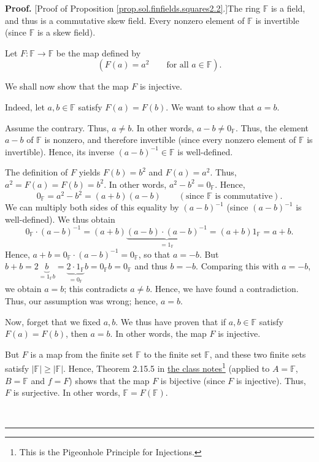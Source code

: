 \documentclass[paper=a4, fontsize=12pt]{scrartcl}%
\theoremstyle{plainsl}
\theoremstyle{definition}
\theoremstyle{remark}
\newenvironment{proof}[1][Proof]{\noindent\textbf{#1.} }{\ \rule{0.5em}{0.5em}}
\begin{document}
\begin{proof}
[Proof of Proposition \ref{prop.sol.finfields.squares2.2}.]The ring
$\mathbb{F}$ is a field, and thus is a commutative skew field. Every nonzero
element of $\mathbb{F}$ is invertible (since $\mathbb{F}$ is a skew field).

Let $F:\mathbb{F}\rightarrow\mathbb{F}$ be the map defined by%
\[
\left(  F\left(  a\right)  =a^{2}\qquad\text{for all }a\in\mathbb{F}\right)
.
\]


We shall now show that the map $F$ is injective.

Indeed, let $a,b\in\mathbb{F}$ satisfy $F\left(  a\right)  =F\left(  b\right)
$. We want to show that $a=b$.

Assume the contrary. Thus, $a\neq b$. In other words, $a-b\neq0_{\mathbb{F}}$.
Thus, the element $a-b$ of $\mathbb{F}$ is nonzero, and therefore invertible
(since every nonzero element of $\mathbb{F}$ is invertible). Hence, its
inverse $\left(  a-b\right)  ^{-1}\in\mathbb{F}$ is well-defined.

The definition of $F$ yields $F\left(  b\right)  =b^{2}$ and $F\left(
a\right)  =a^{2}$. Thus, $a^{2}=F\left(  a\right)  =F\left(  b\right)  =b^{2}%
$. In other words, $a^{2}-b^{2}=0_{\mathbb{F}}$. Hence,%
\[
0_{\mathbb{F}}=a^{2}-b^{2}=\left(  a+b\right)  \left(  a-b\right)
\qquad\left(  \text{since }\mathbb{F}\text{ is commutative}\right)  .
\]
We can multiply both sides of this equality by $\left(  a-b\right)  ^{-1}$
(since $\left(  a-b\right)  ^{-1}$ is well-defined). We thus obtain%
\[
0_{\mathbb{F}}\cdot\left(  a-b\right)  ^{-1}=\left(  a+b\right)
\underbrace{\left(  a-b\right)  \cdot\left(  a-b\right)  ^{-1}}%
_{=1_{\mathbb{F}}}=\left(  a+b\right)  1_{\mathbb{F}}=a+b.
\]
Hence, $a+b=0_{\mathbb{F}}\cdot\left(  a-b\right)  ^{-1}=0_{\mathbb{F}}$, so
that $a=-b$. But $b+b=2\underbrace{b}_{=1_{\mathbb{F}}b}=\underbrace{2\cdot
1_{\mathbb{F}}}_{=0_{\mathbb{F}}}b=0_{\mathbb{F}}b=0_{\mathbb{F}}$ and thus
$b=-b$. Comparing this with $a=-b$, we obtain $a=b$; this contradicts $a\neq
b$. Hence, we have found a contradiction. Thus, our assumption was wrong;
hence, $a=b$.

Now, forget that we fixed $a,b$. We thus have proven that if $a,b\in
\mathbb{F}$ satisfy $F\left(  a\right)  =F\left(  b\right)  $, then $a=b$. In
other words, the map $F$ is injective.

But $F$ is a map from the finite set $\mathbb{F}$ to the finite set
$\mathbb{F}$, and these two finite sets satisfy $\left\vert \mathbb{F}%
\right\vert \geq\left\vert \mathbb{F}\right\vert $. Hence, Theorem 2.15.5 in
\href{http://www.cip.ifi.lmu.de/~grinberg/t/19s/notes.pdf}{the class
notes}\footnote{This is the Pigeonhole Principle for Injections.} (applied to
$A=\mathbb{F}$, $B=\mathbb{F}$ and $f=F$) shows that the map $F$ is bijective
(since $F$ is injective). Thus, $F$ is surjective. In other words,
$\mathbb{F}=F\left(  \mathbb{F}\right)  $.


\end{proof}
\end{document}
